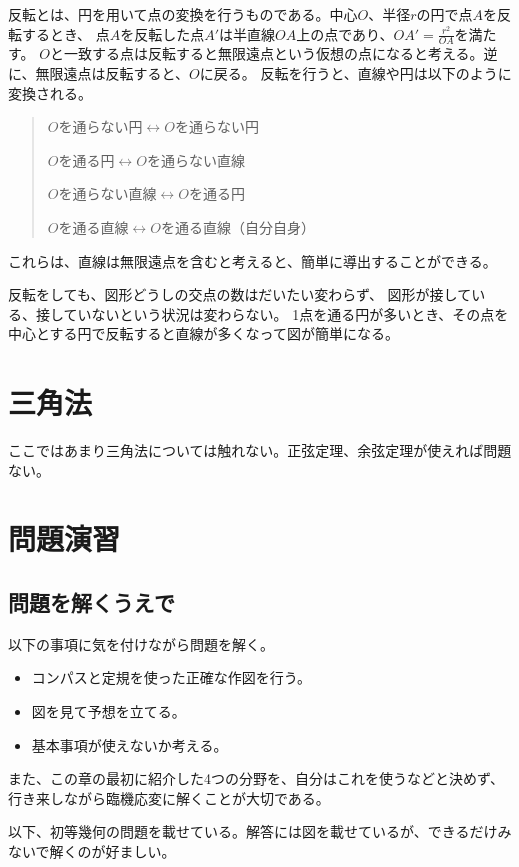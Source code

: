 \documentclass[uplatex,dvipdfmx]{jsbook}
\begin{document}
反転とは、円を用いて点の変換を行うものである。中心$O$、半径$r$の円で点$A$を反転するとき、
点$A$を反転した点$A'$は半直線$OA$上の点であり、$\displaystyle OA'=\frac{r^2}{OA}$を満たす。
$O$と一致する点は反転すると無限遠点という仮想の点になると考える。逆に、無限遠点は反転すると、$O$に戻る。
反転を行うと、直線や円は以下のように変換される。
\begin{quote}
    $O$を通らない円$\leftrightarrow$$O$を通らない円

    $O$を通る円$\leftrightarrow$$O$を通らない直線

    $O$を通らない直線$\leftrightarrow$$O$を通る円

    $O$を通る直線$\leftrightarrow$$O$を通る直線（自分自身）
\end{quote}
これらは、直線は無限遠点を含むと考えると、簡単に導出することができる。

反転をしても、図形どうしの交点の数はだいたい変わらず、
図形が接している、接していないという状況は変わらない。
1点を通る円が多いとき、その点を中心とする円で反転すると直線が多くなって図が簡単になる。

\section{三角法}
ここではあまり三角法については触れない。正弦定理、余弦定理が使えれば問題ない。

\section{問題演習}
\subsection{問題を解くうえで}
以下の事項に気を付けながら問題を解く。
\begin{itemize}
    \item コンパスと定規を使った正確な作図を行う。
    \item 図を見て予想を立てる。
    \item 基本事項が使えないか考える。
\end{itemize}
また、この章の最初に紹介した4つの分野を、自分はこれを使うなどと決めず、行き来しながら臨機応変に解くことが大切である。

以下、初等幾何の問題を載せている。解答には図を載せているが、できるだけみないで解くのが好ましい。
\end{document}
